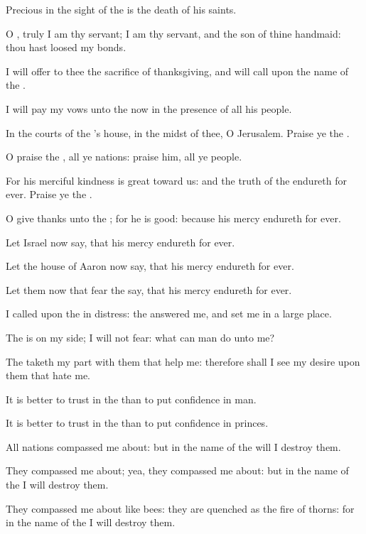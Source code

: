 \Verse Precious in the sight of the \LORD is the death of his saints.

\Verse O \LORD, truly I am thy servant; I am thy servant, and the son of thine handmaid: thou hast loosed my bonds.

\Verse I will offer to thee the sacrifice of thanksgiving, and will call upon the name of the \LORD.

\Verse I will pay my vows unto the \LORD now in the presence of all his people.

\Verse In the courts of the \LORD's house, in the midst of thee, O Jerusalem. Praise ye the \LORD.




\Chapter
\Verse O praise the \LORD, all ye nations: praise him, all ye people.

\Verse For his merciful kindness is great toward us: and the truth of the \LORD endureth for ever. Praise ye the \LORD.




\Chapter
\Verse O give thanks unto the \LORD; for he is good: because his mercy endureth for ever.

\Verse Let Israel now say, that his mercy endureth for ever.

\Verse Let the house of Aaron now say, that his mercy endureth for ever.

\Verse Let them now that fear the \LORD say, that his mercy endureth for ever.

\Verse I called upon the \LORD in distress: the \LORD answered me, and set me in a large place.

\Verse The \LORD is on my side; I will not fear: what can man do unto me?

\Verse The \LORD taketh my part with them that help me: therefore shall I see my desire upon them that hate me.

\Verse It is better to trust in the \LORD than to put confidence in man.

\Verse It is better to trust in the \LORD than to put confidence in princes.

\Verse All nations compassed me about: but in the name of the \LORD will I destroy them.

\Verse They compassed me about; yea, they compassed me about: but in the name of the \LORD I will destroy them.

\Verse They compassed me about like bees: they are quenched as the fire of thorns: for in the name of the \LORD I will destroy them.

